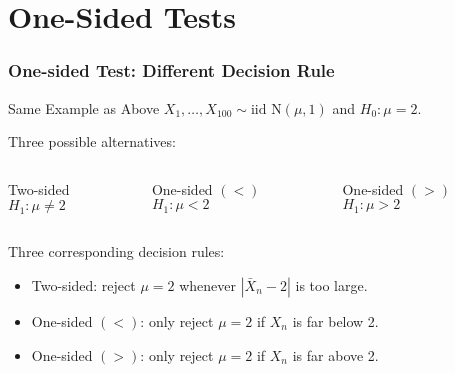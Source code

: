 \section{One-Sided Tests}
\begin{frame}
  \frametitle{One-sided Test: Different Decision Rule} 

  \begin{block}{Same Example as Above}
  $X_1, \dots, X_{100}\sim \mbox{iid N}(\mu, 1)$ and $H_0\colon \mu=2$. 
\end{block}

\begin{alertblock}{Three possible alternatives:}

  \begin{columns}
    \begin{block}{Two-sided}
      $H_1\colon \mu \neq 2$
    \end{block}
    \begin{block}{One-sided $(<)$}
      $H_1\colon \mu < 2$
    \end{block}
    \begin{block}{One-sided $(>)$}
      $H_1\colon \mu > 2$
    \end{block}
  \end{columns}
\end{alertblock}

\vspace{1em}

\begin{block}{Three corresponding decision rules:}
  \begin{itemize}
    \item Two-sided: reject $\mu = 2$ whenever $|\bar{X}_n - 2|$ is too large.
    \item One-sided $(<)$: only reject $\mu = 2$ if $X_n$ is far \alert{below} 2.
    \item One-sided $(>)$: only reject $\mu = 2$ if $X_n$ is far \alert{above} 2.
  \end{itemize}
\end{block}
\end{frame}
